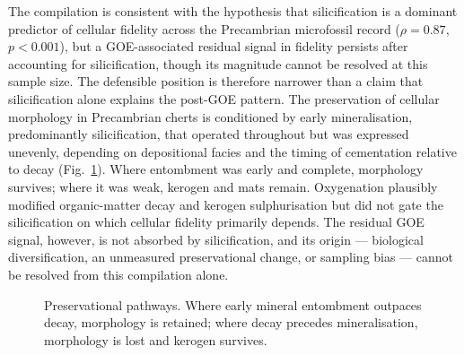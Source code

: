 \documentclass[11pt]{article}
\begin{document}
The compilation is consistent with the hypothesis that silicification is a dominant predictor of
cellular fidelity across the Precambrian microfossil record ($\rho = 0.87$, $p < 0.001$), but a
GOE-associated residual signal in fidelity persists after accounting for silicification, though its
magnitude cannot be resolved at this sample size. The defensible position is therefore narrower than a
claim that silicification alone explains the post-GOE pattern. The preservation of cellular morphology
in Precambrian cherts is conditioned by early mineralisation, predominantly silicification, that
operated throughout but was expressed unevenly, depending on depositional facies and the timing of
cementation relative to decay (Fig.~\ref{fig:model}). Where entombment was early and complete,
morphology survives; where it was weak, kerogen and mats remain. Oxygenation plausibly modified
organic-matter decay and kerogen sulphurisation \citep{Lepot2009,Decraene2021} but did not gate the
silicification on which cellular fidelity primarily depends. The residual GOE signal, however, is
not absorbed by silicification, and its origin --- biological diversification, an unmeasured
preservational change, or sampling bias --- cannot be resolved from this compilation alone.

\begin{figure}[t]
\centering
{}
\caption{Preservational pathways. Where early mineral entombment outpaces decay, morphology is
retained; where decay precedes mineralisation, morphology is lost and kerogen survives.}
\label{fig:model}
\end{figure}
\end{document}
